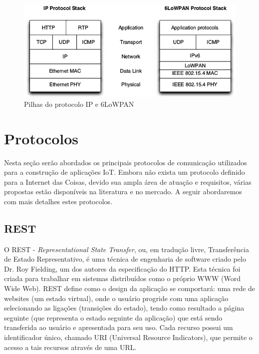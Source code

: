 \begin{figure}
\begin{centering}
\includegraphics[width=1\linewidth]{Imagens/Cap_2/6LoWPAN_1}
\par\end{centering}
\caption{Pilhas do protocolo IP e 6LoWPAN \cite{ZShelby2009} \label{fig:6LoWPAN}}
\end{figure}


\section{Protocolos}

Nesta seção serão abordados os principais protocolos de comunicação
utilizados para a construção de aplicações IoT. Embora não exista
um protocolo definido para a Internet das Coisas, devido sua ampla
área de atuação e requisitos, várias propostas estão disponíveis na
literatura e no mercado. A seguir abordaremos com mais detalhes estes
protocolos.

\subsection{REST}

O REST - \emph{Representational State Transfer}, ou, em tradução livre,
Transferência de Estado Representativo, é uma técnica de engenharia
de software criado pelo Dr. Roy Fielding\cite{fielding2000architectural},
um dos autores da especificação do HTTP. Esta técnica foi criada para
trabalhar em sistemas distribuídos como o próprio WWW (Word Wide Web).
REST define como o design da aplicação se comportará: uma rede de
websites (um estado virtual), onde o usuário progride com uma aplicação
selecionando as ligações (transições do estado), tendo como resultado
a página seguinte (que representa o estado seguinte da aplicação)
que está sendo transferida ao usuário e apresentada para seu uso\cite{fielding2000architectural}.
Cada recurso possui um identificador único, chamado URI (Universal
Resource Indicators), que permite o acesso a tais recursos através
de uma URL. 

